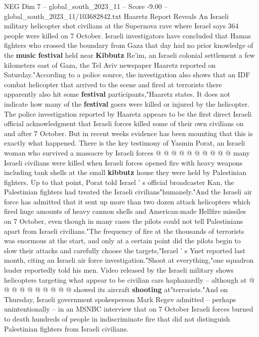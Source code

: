 \begin{textsample}{NEG Dim 7 – global\_south\_2023\_11 – Score -9.00 – global\_south\_2023\_11/103682842.txt}  \label{ex:f7_neg_321}
Haaretz Report Reveals An Israeli military helicopter shot civilians at the Supernova rave where Israel says 364 people were killed on 7 October.
Israeli investigators have concluded that Hamas fighters who crossed the boundary from Gaza that day had no prior knowledge of the \textbf{music} \textbf{festival} held near \textbf{Kibbutz} Re'im, an Israeli colonial settlement a few kilometers east of Gaza, the Tel Aviv newspaper Haaretz reported on Saturday."According to a police source, the investigation also shows that an IDF combat helicopter that arrived to the scene and fired at terrorists there apparently also hit some \textbf{festival} participants,"Haaretz states.
It does not indicate how many of the \textbf{festival} goers were killed or injured by the helicopter.
The police investigation reported by Haaretz appears to be the first direct Israeli official acknowledgment that Israeli forces killed some of their own civilians on and after 7 October.
But in recent weeks evidence has been mounting that this is exactly what happened.
There is the key testimony of Yasmin Porat, an Israeli woman who survived a massacre by Israeli forces @ @ @ @ @ @ @ @ @ @ many Israeli civilians were killed when Israeli forces opened fire with heavy weapons including tank shells at the small \textbf{kibbutz} house they were held by Palestinian fighters.
Up to that point, Porat told Israel ' s official broadcaster Kan, the Palestinian fighters had treated the Israeli civilians"humanely."And the Israeli air force has admitted that it sent up more than two dozen attack helicopters which fired huge amounts of heavy cannon shells and American-made Hellfire missiles on 7 October, even though in many cases the pilots could not tell Palestinians apart from Israeli civilians."The frequency of fire at the thousands of terrorists was enormous at the start, and only at a certain point did the pilots begin to slow their attacks and carefully choose the targets,"Israel ' s Ynet reported last month, citing an Israeli air force investigation."Shoot at everything,"one squadron leader reportedly told his men.
Video released by the Israeli military shows helicopters targeting what appear to be civilian cars haphazardly -- although at @ @ @ @ @ @ @ @ @ @ showed its aircraft \textbf{shooting} at"terrorists."And on Thursday, Israeli government spokesperson Mark Regev admitted -- perhaps unintentionally -- in an MSNBC interview that on 7 October Israeli forces burned to death hundreds of people in indiscriminate fire that did not distinguish Palestinian fighters from Israeli civilians.

\end{textsample}
